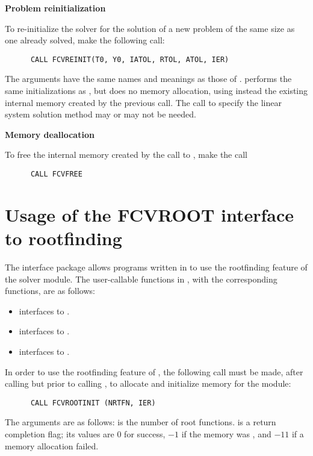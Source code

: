 \begin{Steps}
\item {\bf Problem reinitialization}

  To re-initialize the {\cvode} solver for the solution of a new problem
  of the same size as one already solved, make the following call:
\begin{verbatim}
      CALL FCVREINIT(T0, Y0, IATOL, RTOL, ATOL, IER)
\end{verbatim}
  The arguments have the same names and meanings as those of .
   performs the same initializations as
  , but does no memory allocation, using instead the existing
  internal memory created by the previous  call.  The call to
  specify the linear system solution method may or may not be needed.

\item {\bf Memory deallocation}

  To free the internal memory created by the call to ,
  make the call
\begin{verbatim}
      CALL FCVFREE
\end{verbatim}

\end{Steps}

\section{Usage of the FCVROOT interface to rootfinding}

The {\fcvroot} interface package allows programs written in {\F} to
use the rootfinding feature of the {\cvode} solver module.
The user-callable functions in {\fcvroot}, with the corresponding
{\cvode} functions, are as follows: 
\begin{itemize}
  \item {} interfaces to .
  \item {} interfaces to .
  \item {} interfaces to .
\end{itemize}
In order to use the rootfinding feature of {\cvode}, the following
call must be made, after calling  but prior to calling
, to allocate and initialize memory for the  module:
\begin{verbatim}
      CALL FCVROOTINIT (NRTFN, IER)
\end{verbatim}
The arguments are as follows:
 is the number of root functions.
 is a return completion flag; its values are $0$ for success, $-1$ 
if the  memory was , and $-11$ if a memory allocation failed.

